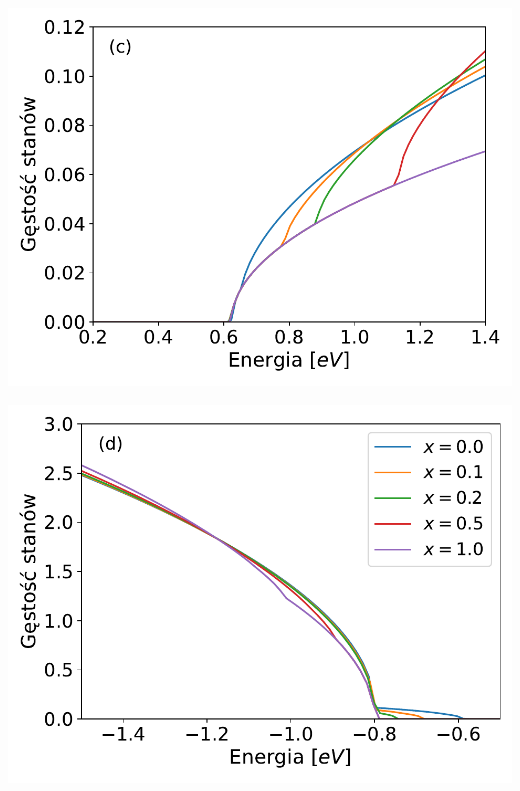 \documentclass[12pt,openany,a4paper]{book}
\begin{document}
\begin{minipage}[t]{0.42\textwidth}
	\hspace{-2.7cm}
	\includegraphics[width = 1\linewidth]{Figures/carriers/dos_L_500.pdf}
\end{minipage}
\begin{minipage}[t]{0.4\textwidth}
	\hspace{-1.5cm}
	\includegraphics[width = \linewidth]{Figures/carriers/dos_val_L_100.pdf}
\end{minipage}
\end{document}
